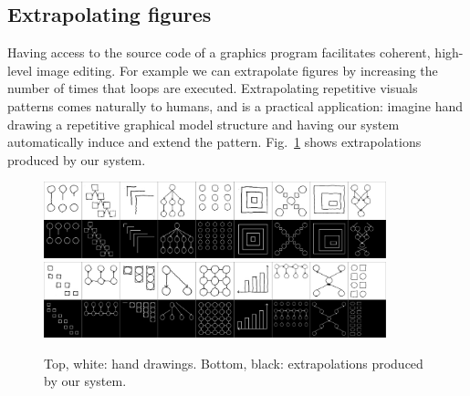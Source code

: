 \documentclass{article}
\newcommand{\remark}[1]{\textcolor{red}{[#1]}}
\theoremstyle{definition}
\begin{document}
\begin{table}[h]
\subsection{Extrapolating figures}
Having access to the source code of a graphics program facilitates coherent, high-level image editing.
For example we can extrapolate figures
by increasing the number of times that loops are executed.
Extrapolating repetitive visuals patterns comes naturally to humans,
and is a practical application:
imagine hand drawing a repetitive graphical model structure
and having our system automatically induce and extend the pattern.
Fig.~\ref{extrapolationFigure} shows extrapolations produced by our system.
\begin{figure}[H]\centering
  \includegraphics[width = 0.885\textwidth]{figures/extrapolationMatrix1.png}
  \includegraphics[width = 0.885\textwidth]{figures/extrapolationMatrix2.png}
   \caption{Top, white: hand drawings. Bottom, black: extrapolations produced by our system.}
  \label{extrapolationFigure}
  \end{figure}
%






\end{table}
\end{document}
